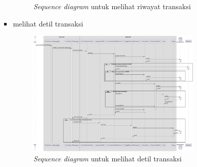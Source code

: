 \documentclass[a4paper]{article}
\begin{document}
\begin{enumerate}
\begin{enumerate}
\begin{itemize}
\begin{figure}[h]
                \caption{\textit{Sequence diagram} untuk melihat riwayat transaksi}
            \end{figure}
            \item melihat detil transaksi
            \begin{figure}[h]
                \centering
                \includegraphics*[height=6cm]{./diagram/sequence diagram/15. transaction/view transaction detail/view transaction detail.png}
                \caption{\textit{Sequence diagram} untuk melihat detil transaksi}
            \end{figure}
        \end{itemize}
        \newpage
        

\end{enumerate}
\end{enumerate}
\end{document}
